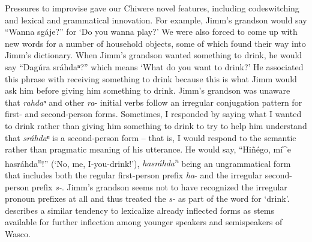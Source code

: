 \documentclass[output=paper]{LSP/langsci}
\begin{document}
Pressures to improvise gave our Chiwere novel features, including codeswitching and lexical and grammatical innovation. For example, Jimm's grandson would say ``Wanna sgáje?'' for `Do you wanna play?' We were also forced to come up with new words for a number of household objects, some of which found their way into Jimm's dictionary. When Jimm's grandson wanted something to drink, he would say ``Dag\'ura sráhdaⁿ?'' which means `What do you want to drink?' He associated this phrase with receiving something to drink because this is what Jimm would ask him before giving him something to drink. Jimm's grandson was unaware that \emph{rahdaⁿ} and other \emph{ra}- initial verbs follow an irregular conjugation pattern for first- and second-person forms. Sometimes, I responded by saying what I wanted to drink rather than giving him something to drink to try to help him understand that \emph{sráhdaⁿ} is a second-person form -- that is, I would respond to the semantic rather than pragmatic meaning of his utterance. He would say, ``Hiñ\'ego, mí\^{ }e hasráhda\textsuperscript{n}!'' (`No, me, I-you-drink!'), \emph{hasráhda\textsuperscript{n}} being an ungrammatical form that includes both the regular first-person prefix \emph{ha}- and the irregular second-person prefix \emph{s-}. Jimm's grandson seems not to have recognized the irregular pronoun prefixes at all and thus treated the \emph{s-} as part of the word for `drink'.  describes a similar tendency to lexicalize already inflected forms as stems available for further inflection among younger speakers and semispeakers of Wasco. 
\end{document}
